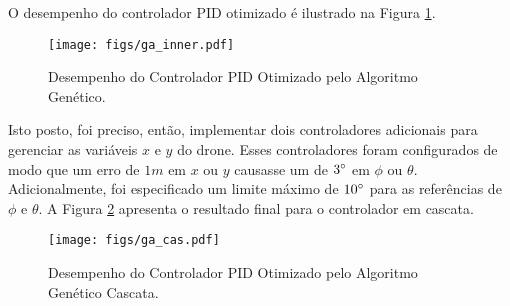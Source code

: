 O desempenho do controlador PID otimizado é ilustrado na Figura \ref{fig:ga_performance}.
\begin{figure}[h!]
    \centering
    \caption{Desempenho do Controlador PID Otimizado pelo Algoritmo Genético.}
    \texttt{[image: figs/ga\_inner.pdf]}
    \label{fig:ga_performance}
\end{figure}
\label{par:ga_cascate}

Isto posto, foi preciso, então, implementar dois controladores adicionais para gerenciar as 
variáveis $x$ e $y$ do drone. Esses controladores foram configurados de modo que um erro de $1m$ 
em $x$ ou $y$ causasse um de $3\degree$ em $\phi$ ou $\theta$. Adicionalmente, foi 
especificado um limite máximo de $10\degree$ para as referências de $\phi$ e $\theta$. A Figura 
\ref{fig:ga_outer_performance} apresenta o resultado final para o controlador em cascata. 
\begin{figure}[h!]
    \centering
    \caption{Desempenho do Controlador PID Otimizado pelo Algoritmo Genético Cascata.}
    \texttt{[image: figs/ga\_cas.pdf]}
    \label{fig:ga_outer_performance}
\end{figure}